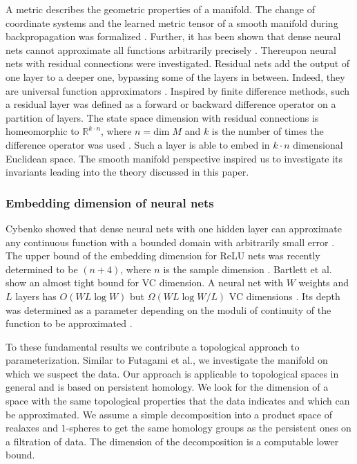 \documentclass[runningheads,orivec]{llncs}
\begin{document}
A metric describes the geometric properties of a manifold. The change of coordinate systems and the learned metric tensor of a smooth manifold during backpropagation was formalized \cite{HauserR17}. Further, it has been shown that dense neural nets cannot approximate all functions arbitrarily precisely \cite{Johnson19}. Thereupon neural nets with residual connections were investigated. Residual nets add the output of one layer to a deeper one, bypassing some of the layers in between. Indeed, they are universal function approximators \cite{LinJ18}. Inspired by finite difference methods, such a residual layer was defined as a forward or backward difference operator on a partition of layers. The state space dimension with residual connections is homeomorphic to $\mathbb{R}^{k \cdot n}$, where $n = \text{dim} \; M$ and $k$ is the number of times the difference operator was used \cite{HauserGJR19}. Such a layer is able to embed in $k\cdot n$ dimensional Euclidean space. The smooth manifold perspective inspired us to investigate its invariants leading into the theory discussed in this paper.

\subsubsection*{Embedding dimension of neural nets} Cybenko showed that dense neural nets with one hidden layer can approximate any continuous function with a bounded domain with arbitrarily small error \cite{Cybenko92}. The upper bound of the embedding dimension for ReLU nets was recently determined to be $(n+4)$, where $n$ is the sample dimension \cite{RaghuPKGS17}. Bartlett et al. show an almost tight bound for VC dimension. A neural net with $W$ weights and $L$ layers has $O(WL \log W)$ but $\Omega(WL \log W/L)$ VC dimensions \cite{BartlettHLM19}. Its depth was determined as a parameter depending on the moduli of continuity of the function to be approximated \cite{LinJ18}. 

To these fundamental results we contribute a topological approach to parameterization. Similar to Futagami et al.\cite{FutagamiYS19}, we investigate the manifold on which we suspect the data. Our approach is applicable to topological spaces in general and is based on persistent homology. We look for the dimension of a space with the same topological properties that the data indicates and which can be approximated. We assume a simple decomposition into a product space of realaxes and $1$-spheres to get the same homology groups as the persistent ones on a filtration of data. The dimension of the decomposition is a computable lower bound.
\end{document}
